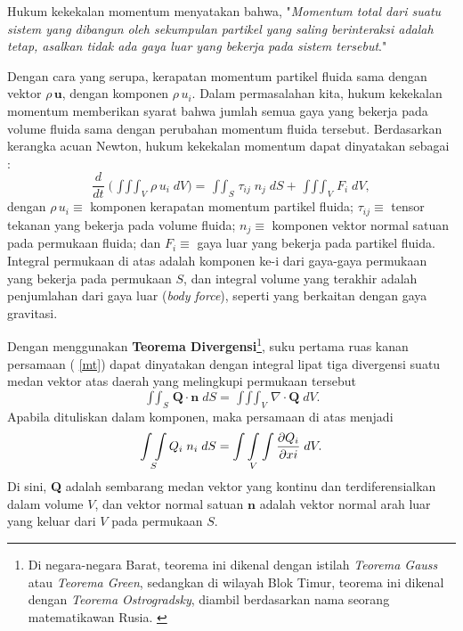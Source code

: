 \documentclass[12pt,a4paper]{report}
\begin{document}
Hukum kekekalan momentum menyatakan bahwa, "\textit{Momentum total dari
suatu sistem yang dibangun oleh sekumpulan partikel yang saling berinteraksi
adalah tetap, asalkan tidak ada gaya luar yang bekerja pada sistem tersebut}."

Dengan cara yang serupa, kerapatan momentum partikel fluida sama dengan
vektor $\rho\,\mathbf{u}$, dengan komponen $\rho\,u_{i}$. Dalam permasalahan
kita, hukum kekekalan momentum memberikan syarat bahwa jumlah semua gaya
yang bekerja pada volume fluida sama dengan perubahan momentum fluida
tersebut. Berdasarkan kerangka acuan Newton, hukum kekekalan momentum dapat
dinyatakan sebagai :
\begin{equation}
\frac{d}{dt}\; \Bigg(\mathop{\int\int\int}_{V} \rho\, u_{i} \; dV\Bigg) = %
\mathop{\int\int}_{S} \tau_{ij} \; n_{j} \; dS + \mathop{\int\int\int}_{V}
F_{i} \; dV,  \label{mt}
\end{equation}
dengan\newline
$\rho\,u_{i} \equiv$ komponen kerapatan momentum partikel fluida; \newline
$\tau_{ij} \equiv$ tensor tekanan yang bekerja pada volume fluida; \newline
$n_{j} \equiv$ komponen vektor normal satuan pada permukaan fluida; dan
\newline
$F_{i} \equiv$ gaya luar yang bekerja pada partikel fluida. \newline
Integral permukaan di atas adalah komponen ke-i dari gaya-gaya permukaan
yang bekerja pada permukaan $S$, dan integral volume yang terakhir adalah
penjumlahan dari gaya luar (\textit{body force}), seperti yang berkaitan
dengan gaya gravitasi.

Dengan menggunakan \textbf{Teorema Divergensi}\footnote[1]{%
Di negara-negara Barat, teorema ini dikenal dengan istilah \textit{Teorema
Gauss} atau \textit{Teorema Green}, sedangkan di wilayah Blok Timur, teorema
ini dikenal dengan \textit{Teorema Ostrogradsky}, diambil berdasarkan nama
seorang matematikawan Rusia. \cite{tgb}}, suku pertama ruas kanan persamaan (%
\ref{mt}) dapat dinyatakan dengan integral lipat tiga divergensi suatu medan
vektor atas daerah yang melingkupi permukaan tersebut
\begin{equation}
\mathop{\int\int}_{S} \mathbf{Q}\cdot\mathbf{n} \; dS = \mathop{\int\int\int}%
_{V} \nabla\cdot\mathbf{Q} \; dV.  \label{tdg}
\end{equation}
Apabila dituliskan dalam komponen, maka persamaan di atas menjadi
\begin{equation}
\mathop{\int\int}_{S} Q_{i}\; n_{i} \; dS = \mathop{\int\int\int}_{V} \frac{%
\partial Q_{i}}{\partial x{i}}\; dV.  \label{td}
\end{equation}
Di sini, \textbf{Q} adalah sembarang medan vektor yang kontinu dan
terdiferensialkan dalam volume $V$, dan vektor normal satuan $\mathbf{n}$
adalah vektor normal arah luar yang keluar dari $V$ pada permukaan $S$.
\end{document}
